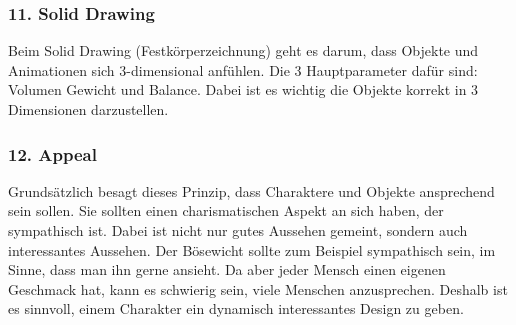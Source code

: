 \subsubsection{11. Solid Drawing}
Beim Solid Drawing (Festkörperzeichnung) geht es darum, dass Objekte und Animationen sich 3-dimensional anfühlen.
Die 3 Hauptparameter dafür sind: Volumen Gewicht und Balance. Dabei ist es wichtig die Objekte korrekt in 3 Dimensionen darzustellen.

\subsubsection{12. Appeal}
Grundsätzlich besagt dieses Prinzip, dass Charaktere und Objekte ansprechend sein sollen. Sie sollten einen charismatischen
Aspekt an sich haben, der sympathisch ist. Dabei ist nicht nur gutes Aussehen gemeint, sondern auch interessantes Aussehen. Der Bösewicht sollte zum Beispiel sympathisch sein, im Sinne, dass man ihn gerne ansieht.
Da aber jeder Mensch einen eigenen Geschmack hat, kann es schwierig sein, viele Menschen anzusprechen. Deshalb ist es sinnvoll, einem Charakter ein dynamisch interessantes Design zu geben.
